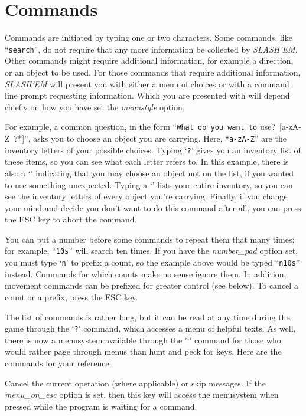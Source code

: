 \section{Commands}


Commands are initiated by typing one or two characters.  Some commands,
like ``{\tt search}'', do not require that any more information be collected by
{\it SLASH'EM}.  Other commands might require additional information, for
example a direction, or an object to be used.  For those commands that
require additional information, {\it SLASH'EM\/} will present you with either a
menu of choices or with a command line prompt requesting information.  Which
you are presented with will depend chiefly on how you have set the
{\it menustyle\/} 
option.

For example, a common question, in the form ``{\tt What do you want to}
use?\ [a-zA-Z\ ?*]'', asks you to choose an object you are carrying.
Here, ``{\tt a-zA-Z}'' are the inventory letters of your possible choices.
Typing `{\tt ?}' gives you an inventory list of these items, so you can see
what each letter refers to.  In this example, there is also a `{\tt *}'
indicating that you may choose an object not on the list, if you
wanted to use something unexpected.  Typing a `{\tt *}' lists your entire
inventory, so you can see the inventory letters of every object you're
carrying.  Finally, if you change your mind and decide you don't want
to do this command after all, you can press the ESC key to abort the
command.

You can put a number before some commands to repeat them that many
times; for example, ``{\tt 10s}'' will search ten times.  If you have the
{\it number_pad\/} 
option set, you must type `{\tt n}' to prefix a count, so the example above
would be typed ``{\tt n10s}'' instead.  Commands for which counts make no
sense ignore them.  In addition, movement commands can be prefixed for
greater control (see below).  To cancel a count or a prefix, press the
ESC key.

The list of commands is rather long, but it can be read at any time
during the game through the `{\tt ?}' command, which accesses a menu of
helpful texts.  As well,  there is now a menusystem available
through the '`{\tt }' command for those who would rather page through
menus than hunt and peck for keys. Here are the commands for your reference:
\blist{}

\item[\tb{{\rm ESC}}]
Cancel the current operation (where applicable) or skip messages. If the
{\it menu_on_esc\/} 
option is set, then this key will access the menusystem when pressed while
the program is waiting for a command.

